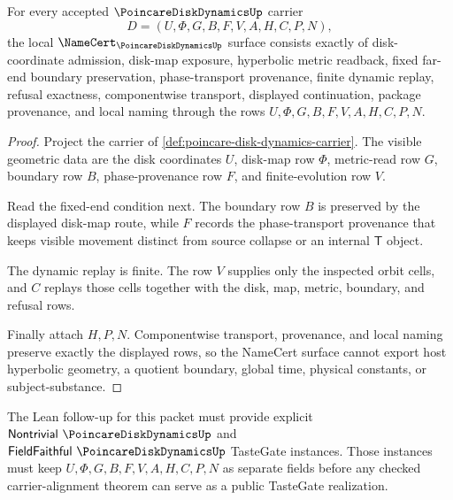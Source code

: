 \begin{theorem}
\label{thm:poincare-disk-dynamics-namecert-obligations}
For every accepted $\PoincareDiskDynamicsUp$ carrier
$$
D=(U,\Phi,G,B,F,V,A,H,C,P,N),
$$
the local $\NameCert_{\PoincareDiskDynamicsUp}$ surface consists exactly of disk-coordinate admission, disk-map exposure, hyperbolic metric readback, fixed far-end boundary preservation, phase-transport provenance, finite dynamic replay, refusal exactness, componentwise transport, displayed continuation, package provenance, and local naming through the rows $U,\Phi,G,B,F,V,A,H,C,P,N$.
\end{theorem}
\begin{proof}
Project the carrier of \autoref{def:poincare-disk-dynamics-carrier}. The visible geometric data are the disk coordinates $U$, disk-map row $\Phi$, metric-read row $G$, boundary row $B$, phase-provenance row $F$, and finite-evolution row $V$.

Read the fixed-end condition next. The boundary row $B$ is preserved by the displayed disk-map route, while $F$ records the phase-transport provenance that keeps visible movement distinct from source collapse or an internal $\mathsf{T}$ object.

The dynamic replay is finite. The row $V$ supplies only the inspected orbit cells, and $C$ replays those cells together with the disk, map, metric, boundary, and refusal rows.

Finally attach $H,P,N$. Componentwise transport, provenance, and local naming preserve exactly the displayed rows, so the NameCert surface cannot export host hyperbolic geometry, a quotient boundary, global time, physical constants, or subject-substance.
\end{proof}



The Lean follow-up for this packet must provide explicit $\mathsf{Nontrivial}\ \PoincareDiskDynamicsUp$ and $\mathsf{FieldFaithful}\ \PoincareDiskDynamicsUp$ TasteGate instances. Those instances must keep $U,\Phi,G,B,F,V,A,H,C,P,N$ as separate fields before any checked carrier-alignment theorem can serve as a public TasteGate realization.

